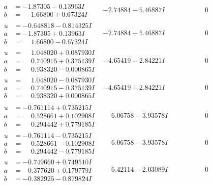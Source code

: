 \documentclass[1p]{elsarticle_modified}
\theoremstyle{definition}
\begin{document}
$$\begin{array}{c|c|c}
\begin{aligned}
a &= -1.87305 - 0.13963 I \\
b &= \phantom{-}1.66800 + 0.67324 I\end{aligned}
 & -2.74884 - 5.46887 I & \phantom{-0.000000 } 0 \\ \hline\begin{aligned}
u &= -0.648818 - 0.814325 I \\
a &= -1.87305 + 0.13963 I \\
b &= \phantom{-}1.66800 - 0.67324 I\end{aligned}
 & -2.74884 + 5.46887 I & \phantom{-0.000000 } 0 \\ \hline\begin{aligned}
u &= \phantom{-}1.048020 + 0.087930 I \\
a &= \phantom{-}0.740915 + 0.375139 I \\
b &= \phantom{-}0.938320 - 0.000865 I\end{aligned}
 & -4.65419 - 2.84221 I & \phantom{-0.000000 } 0 \\ \hline\begin{aligned}
u &= \phantom{-}1.048020 - 0.087930 I \\
a &= \phantom{-}0.740915 - 0.375139 I \\
b &= \phantom{-}0.938320 + 0.000865 I\end{aligned}
 & -4.65419 + 2.84221 I & \phantom{-0.000000 } 0 \\ \hline\begin{aligned}
u &= -0.761114 + 0.735215 I \\
a &= \phantom{-}0.528661 + 0.102908 I \\
b &= \phantom{-}0.294442 + 0.779185 I\end{aligned}
 & \phantom{-}6.06758 + 3.93578 I & \phantom{-0.000000 } 0 \\ \hline\begin{aligned}
u &= -0.761114 - 0.735215 I \\
a &= \phantom{-}0.528661 - 0.102908 I \\
b &= \phantom{-}0.294442 - 0.779185 I\end{aligned}
 & \phantom{-}6.06758 - 3.93578 I & \phantom{-0.000000 } 0 \\ \hline\begin{aligned}
u &= -0.749660 + 0.749510 I \\
a &= -0.377620 + 0.179779 I \\
b &= -0.382925 - 0.879824 I\end{aligned}
 & \phantom{-}6.42114 - 2.03089 I & \phantom{-0.000000 } 0 \\ \hline\begin{aligned}

\end{aligned}
\end{array}$$
\end{document}
